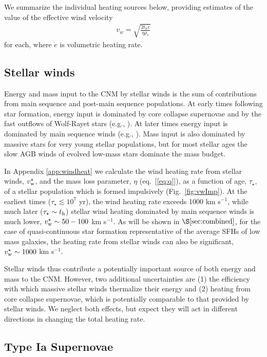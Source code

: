 \documentclass[usenatbib,fleqn]{mn2e}
\newcommand{\rhostar}{\rho_*}
\begin{document}
We summarize the individual heating sources below, providing estimates
of the value of the effective wind velocity
\begin{align}
  v_{w} = \sqrt{\frac{2 t_h \dot{e}}{\eta \rhostar}}
  \label{eq:vw_eff}
\end{align}
for each, where $\dot{e}$ is volumetric heating rate.  

\subsection{Stellar winds} 

Energy and mass input to the CNM by stellar winds is the sum of
contributions from main sequence and post-main sequence populations.
At early times following star formation, energy input is dominated by
core collapse supernovae and by the fast outflows of Wolf-Rayet stars
(e.g., \citealt{VossDiehl+:2009a}).  At later times energy input is
dominated by main sequence winds (e.g.,
\citealt{NaimanSoares-Furtado+:2013a}).  Mass input is also dominated
by massive stars for very young stellar populations, but for most
stellar ages the slow AGB winds of evolved low-mass stars dominate the
mass budget.

In Appendix \ref{app:windheat} we calculate the wind heating rate from
stellar winds, $v_{\rm w}^{\star}$, and the mass loss parameter,
$\eta$ (eq.~[\ref{eq:q}]), as a function of age, $\tau_{\star}$, of a
stellar population which is formed impulsively (Fig.~\ref{fig:vwImp}).
At the earliest times ($\tau_{\star} \lesssim 10^{7}$ yr), the wind
heating rate exceeds 1000 km s$^{-1}$, while much later ($\tau_{\star}
\sim t_{\rm h}$) stellar wind heating dominated by main sequence winds
is much lower, $v^{\star}_{\rm w} \sim 50-100 $ km s$^{-1}$.  As will
be shown in $\S\ref{sec:combined}$, for the case of quasi-continuous
star formation representative of the average SFHs of low mass
galaxies, the heating rate from stellar winds can also be significant,
$v_{\rm w}^{\star} \sim 1000$ km s$^{-1}$.

Stellar winds thus contribute a potentially important source of both
energy and mass to the CNM.  However, two additional uncertainties are
(1) the efficiency with which massive stellar winds thermalize their
energy and (2) heating from core collapse supernovae, which is
potentially comparable to that provided by stellar winds.  We neglect
both effects, but expect they will act in different directions in
changing the total heating rate.

\subsection{Type Ia Supernovae} 
\end{document}

